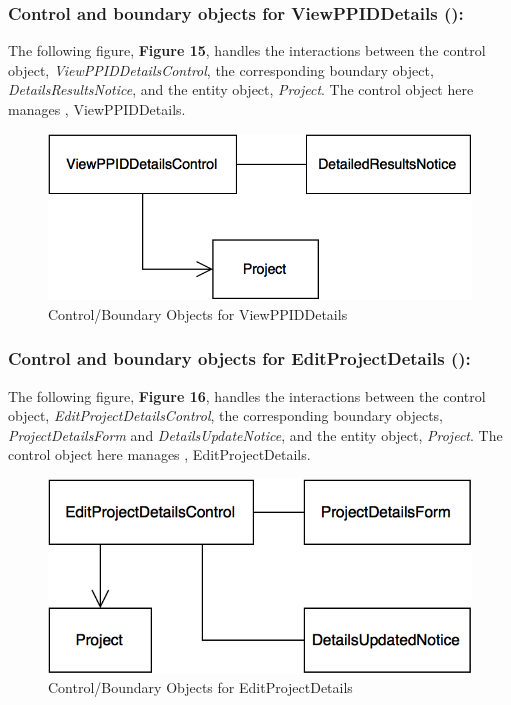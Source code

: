 \documentclass[12pt,letterpaper]{article}
\begin{document}
\subsubsection*{Control and boundary objects for ViewPPIDDetails (\viewppiddetails{}):}

The following figure, {\bf Figure 15}, handles the interactions between the control object, {\it ViewPPIDDetailsControl}, the corresponding boundary object, 
{\it DetailsResultsNotice}, and the entity object, {\it Project}. The control object here manages \viewppiddetails{}, ViewPPIDDetails.

\vspace{1em}

\begin{figure}[H]
	\centering{}
	\includegraphics[scale=0.37]{imgs/cbod/view-ppid-details.png}
	\caption{Control/Boundary Objects for ViewPPIDDetails}
\end{figure}

\newpage{}

\subsubsection*{Control and boundary objects for EditProjectDetails (\editprojectdetails{}):}

The following figure, {\bf Figure 16}, handles the interactions between the control object, {\it EditProjectDetailsControl}, the corresponding boundary objects, 
{\it ProjectDetailsForm} and {\it DetailsUpdateNotice}, and the entity object, {\it Project}. The control object here manages \editprojectdetails{}, EditProjectDetails.

\begin{figure}[H]
	\centering{}
	\includegraphics[scale=0.37]{imgs/cbod/edit-project-details.png}
	\caption{Control/Boundary Objects for EditProjectDetails}    
\end{figure}
\end{document}
